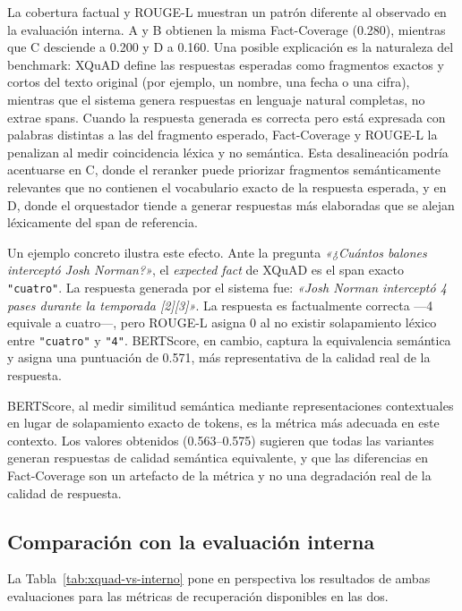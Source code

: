 La cobertura factual y ROUGE-L muestran un patrón diferente al observado en la evaluación interna.
A y B obtienen la misma Fact-Coverage (0.280), mientras que C desciende a 0.200 y D a 0.160.
Una posible explicación es la naturaleza del benchmark: XQuAD define las respuestas esperadas como fragmentos exactos y cortos del texto original (por ejemplo, un nombre, una fecha o una cifra), mientras que el sistema genera respuestas en lenguaje natural completas, no extrae spans.
Cuando la respuesta generada es correcta pero está expresada con palabras distintas a las del fragmento esperado, Fact-Coverage y ROUGE-L la penalizan al medir coincidencia léxica y no semántica.
Esta desalineación podría acentuarse en C, donde el reranker puede priorizar fragmentos semánticamente relevantes que no contienen el vocabulario exacto de la respuesta esperada, y en D, donde el orquestador tiende a generar respuestas más elaboradas que se alejan léxicamente del span de referencia.

Un ejemplo concreto ilustra este efecto. Ante la pregunta \textit{«¿Cuántos balones interceptó Josh Norman?»}, el \textit{expected fact} de XQuAD es el span exacto \texttt{"cuatro"}. La respuesta generada por el sistema fue: \textit{«Josh Norman interceptó 4 pases durante la temporada [2][3]»}. La respuesta es factualmente correcta —4 equivale a cuatro—, pero ROUGE-L asigna 0 al no existir solapamiento léxico entre \texttt{"cuatro"} y \texttt{"4"}. BERTScore, en cambio, captura la equivalencia semántica y asigna una puntuación de 0.571, más representativa de la calidad real de la respuesta.

BERTScore, al medir similitud semántica mediante representaciones contextuales en lugar de solapamiento exacto de tokens, es la métrica más adecuada en este contexto. 
Los valores obtenidos (0.563–0.575) sugieren que todas las variantes generan respuestas de calidad semántica equivalente, y que las diferencias en Fact-Coverage son un artefacto de la métrica y no una degradación real de la calidad de respuesta.

\subsection{Comparación con la evaluación interna}\label{subsec:xquad-comparacion}

La Tabla~\ref{tab:xquad-vs-interno} pone en perspectiva los resultados de ambas evaluaciones para las métricas de recuperación disponibles en las dos.

